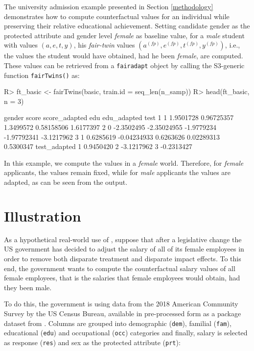 \documentclass[
  nojss]{jss}
\begin{document}
The university admission example presented in Section \ref{methodology}
demonstrates how to compute counterfactual values for an individual
while preserving their relative educational achievement. Setting
candidate gender as the protected attribute and gender level
\emph{female} as baseline value, for a \emph{male} student with values
\((a, e, t, y)\), his \emph{fair-twin} values
\(( {a}^{(fp)},  {e}^{(fp)},  {t}^{(fp)},  {y}^{(fp)})\), i.e., the
values the student would have obtained, had he been \emph{female}, are
computed. These values can be retrieved from a \texttt{fairadapt} object
by calling the S3-generic function \texttt{fairTwins()} as:

\begin{CodeChunk}
\begin{CodeInput}
R> ft_basic <- fairTwins(basic, train.id = seq_len(n_samp))
R> head(ft_basic, n = 3)
\end{CodeInput}
\begin{CodeOutput}
  gender      score score_adapted        edu edu_adapted       test
1      1  1.9501728    0.96725357  1.3499572  0.58158506  1.6177397
2      0 -2.3502495   -2.35024955 -1.9779234 -1.97792341 -3.1217962
3      1  0.6285619   -0.04234933  0.6263626  0.02289313  0.5300347
  test_adapted
1    0.9450420
2   -3.1217962
3   -0.2313427
\end{CodeOutput}
\end{CodeChunk}

In this example, we compute the values in a \emph{female} world.
Therefore, for \emph{female} applicants, the values remain fixed, while
for \emph{male} applicants the values are adapted, as can be seen from
the output.

\hypertarget{illustration}{%
\section{Illustration}\label{illustration}}

As a hypothetical real-world use of , suppose that after
a legislative change the US government has decided to adjust the salary
of all of its female employees in order to remove both disparate
treatment and disparate impact effects. To this end, the government
wants to compute the counterfactual salary values of all female
employees, that is the salaries that female employees would obtain, had
they been male.

To do this, the government is using data from the 2018 American
Community Survey by the US Census Bureau, available in pre-processed
form as a package dataset from . Columns are grouped into
demographic (\texttt{dem}), familial (\texttt{fam}), educational
(\texttt{edu}) and occupational (\texttt{occ}) categories and finally,
salary is selected as response (\texttt{res}) and sex as the protected
attribute (\texttt{prt}):
\end{document}
